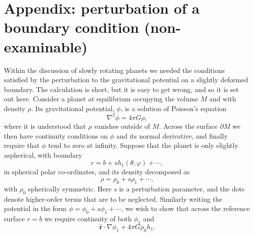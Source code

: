 \section*{Appendix: perturbation of a boundary condition (non-examinable)}
Within the discussion of slowly rotating planets we needed the conditions satisfied by the perturbation to the gravitational potential 
on a slightly deformed boundary. The calculation is short, but it is easy to get wrong, and so it is set out here. Consider a planet at equilibrium occupying the volume $M$ and with density $\rho$. Its gravitational potential, $\phi$, is a solution of Poisson's equation
\begin{equation*}
    \nabla^{2}\phi=4\pi G\rho,
\end{equation*}
where it is understood that $\rho$ vanishes outside of $M$. Across the surface $\partial M$ we then have continuity conditions on $\phi$ and its normal derivative, and finally require that $\phi$ tend to zero at infinity. Suppose that the planet is only slightly aspherical, with boundary
\begin{equation*}
    r=b+sh_{1}(\theta,\varphi)+\cdots,
\end{equation*}
in spherical polar co-ordinates, and its density decomposed as
\begin{equation*}
    \rho=\rho_{0}+s\rho_{1}+\cdots,
\end{equation*}
with $\rho_{0}$ spherically symmetric. Here $s$ is a perturbation parameter, and the dots denote higher-order terms that are to be neglected. Similarly writing the potential in the form $\phi=\phi_{0}+s\phi_{1}+\cdots$, we wish to show that across the reference surface $r=b$ we require continuity of both $\phi_{1}$ and
\begin{equation*}
    \hat{\mathbf{r}}\cdot\nabla\phi_{1}+4\pi G\rho_{0}h_{1}.
\end{equation*}


